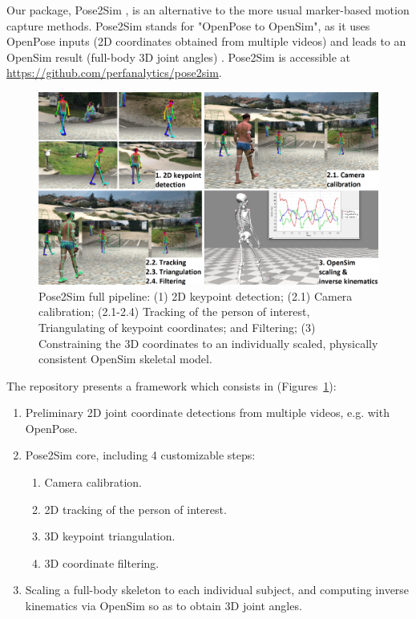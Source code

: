 Our package, Pose2Sim \cite{Pagnon2022b}, is an alternative to the more usual marker-based motion capture methods. Pose2Sim stands for "OpenPose to OpenSim", as it uses OpenPose inputs (2D coordinates obtained from multiple videos) \cite{Cao2019} and leads to an OpenSim result (full-body 3D joint angles) \cite{Delp2007,Seth2018}. Pose2Sim is accessible at \url{https://github.com/perfanalytics/pose2sim}.

\begin{figure}[hbtp]
	\centering
	\def\svgwidth{1\columnwidth}
	\fontsize{10pt}{10pt}\selectfont
	\includegraphics[width=\linewidth]{"../Chap3/Figures/Fig_Pipeline.png"}
	\caption{Pose2Sim full pipeline: (1) 2D keypoint detection; (2.1) Camera calibration; \newline(2.1-2.4) Tracking of the person of interest, Triangulating of keypoint coordinates; and Filtering; (3) Constraining the 3D coordinates to an individually scaled, physically consistent OpenSim skeletal model.}
	\label{fig_pipeline}
\end{figure}

\newpage

The repository presents a framework which consists in (Figures~\ref{fig_pipeline}):
\begin{enumerate}[itemsep=0em, topsep=0em, leftmargin=*]
      \item Preliminary 2D joint coordinate detections from multiple videos, e.g. with OpenPose.
      \item Pose2Sim core, including 4 customizable steps:
      \begin{enumerate}[before=\vspace{-0.5\baselineskip}, nosep, label*=\arabic*.]
            \item Camera calibration.
            \item 2D tracking of the person of interest.
            \item 3D keypoint triangulation.
            \item 3D coordinate filtering.
      \end{enumerate}
      \item Scaling a full-body skeleton to each individual subject, and computing inverse kinematics via OpenSim so as to obtain 3D joint angles.
\end{enumerate}

